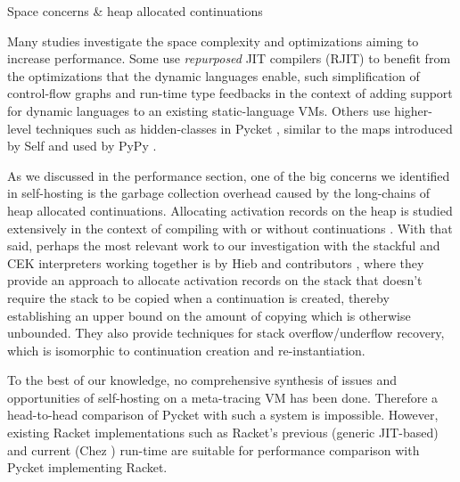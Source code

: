         \begin{paragraph-here}%
            Space concerns \& heap allocated continuations

            Many studies investigate the space complexity and optimizations aiming
            to increase performance. Some use \emph{repurposed} JIT compilers
            (RJIT) to benefit from the optimizations that the dynamic languages
            enable, such simplification of control-flow graphs
            \cite{dynStatComp:12} and run-time type feedbacks \cite{stJITdyn:12}
            in the context of adding support for dynamic languages to an existing
            static-language VMs. Others use higher-level techniques such as
            hidden-classes in Pycket \cite{pycketmain2}, similar to the maps
            introduced by Self \cite{self-maps:89} and used by PyPy
            \cite{runtime-feedback:11}.

            As we discussed in the performance section, one of the big concerns we
            identified in self-hosting is the garbage collection overhead caused
            by the long-chains of heap allocated continuations. Allocating
            activation records on the heap is studied extensively in the context
            of compiling with \cite{comp-cont:92} or without
            \cite{comp-without-cont:17} continuations \cite{whatever:19}. With
            that said, perhaps the most relevant work to our investigation with
            the stackful and CEK interpreters working together is by Hieb and
            contributors \cite{cont-heap-stack:90}, where they provide an approach
            to allocate activation records on the stack that doesn't require the
            stack to be copied when a continuation is created, thereby
            establishing an upper bound on the amount of copying which is
            otherwise unbounded. They also provide techniques for stack
            overflow/underflow recovery, which is isomorphic to continuation
            creation and re-instantiation.

            To the best of our knowledge, no comprehensive synthesis of issues and
            opportunities of self-hosting on a meta-tracing VM has been
            done. Therefore a head-to-head comparison of Pycket with such a system
            is impossible. However, existing Racket implementations such as
            Racket's previous (generic JIT-based) and current (Chez
            \cite{icfp2019}) run-time are suitable for performance
            comparison with Pycket implementing Racket.
        \end{paragraph-here}

